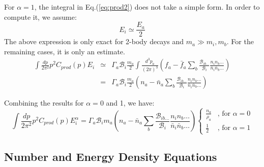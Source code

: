 \documentclass[preprint,notoc]{JHEP3}
\begin{document}
For $\alpha = 1$, the integral in Eq.(\ref{eq:prod2}) does not take a simple
form. In order to compute it, we assume:
\begin{equation}
E_i \simeq \frac{E_a}{2}
\end{equation}
The above expression is only exact for 2-body decays and $m_a \gg
m_i,m_b$. For the remaining cases, it is only an estimate.
\begin{eqnarray}
\int \frac{dp}{2 \pi^2} p^2 C_{prod}(p) E_i & \simeq & 
\Gamma_a \mathcal{B}_{i}  \frac{m_a}{2} \int \frac{d^3 p_a}{(2
\pi)^3} \left(f_a - \bar{f}_a \sum_b
\frac{\mathcal{B}_{ib\ldots}}{\mathcal{B}_{i}}
 \frac{n_i n_b \ldots}{\bar{n}_i \bar{n}_b \ldots} \right)
\nonumber
\\
& = & \Gamma_a \mathcal{B}_{i}  \frac{m_a}{2} \left( n_a -
\bar{n}_a \sum_b \frac{\mathcal{B}_{ib\ldots}}{\mathcal{B}_{i}} \frac{n_i n_b
\ldots}{\bar{n}_i \bar{n}_b \ldots} \right)
\end{eqnarray}


Combining the results for $\alpha = 0$ and 1, we have:
\begin{equation}
\int \frac{dp}{2 \pi^2} p^2 C_{prod}(p) E_i^{\alpha} = 
\Gamma_a \mathcal{B}_{i} m_a  \left( n_a - \bar{n}_a
\sum_b \frac{\mathcal{B}_{ib\ldots}}{\mathcal{B}_{i}} \frac{n_i n_b
\ldots}{\bar{n}_i
\bar{n}_b \ldots} \right) \left\{ \begin{array}{ll}  \frac{n_a}{\rho_a}  & \mbox{, for $\alpha = 0$} 
\\
 \frac{1}{2}  & \mbox{, for $\alpha = 1$}
\end{array} \right. \label{eq:prodfin}
\end{equation}

\subsection{Number and Energy Density Equations}
\end{document}
